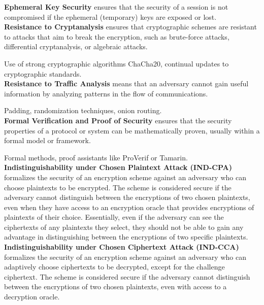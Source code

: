 \documentclass[pdflatex,sn-mathphys-num]{sn-jnl}%
\theoremstyle{thmstyleone}%
\theoremstyle{thmstyletwo}%
\theoremstyle{thmstylethree}%
\begin{document}
\noindent \textbf{Ephemeral Key Security} ensures that the security of a session is not compromised if the ephemeral (temporary) keys are exposed or lost.\\



\noindent \textbf{Resistance to Cryptanalysis} ensures that cryptographic schemes are resistant to attacks that aim to break the encryption, such as brute-force attacks, differential cryptanalysis, or algebraic attacks.

 Use of strong cryptographic algorithms  ChaCha20, continual updates to cryptographic standards.\\

 \noindent \textbf{Resistance to Traffic Analysis} means that an adversary cannot gain useful information by analyzing patterns in the flow of communications.

 Padding, randomization techniques, onion routing.\\


\noindent \textbf{Formal Verification and Proof of Security} ensures that the security properties of a protocol or system can be mathematically proven, usually within a formal model or framework.

 Formal methods, proof assistants like ProVerif or Tamarin.\\

\noindent \textbf{Indistinguishability under Chosen Plaintext Attack (IND-CPA)} formalizes the security of an encryption scheme against an adversary who can choose plaintexts to be encrypted. The scheme is considered secure if the adversary cannot distinguish between the encryptions of two chosen plaintexts, even when they have access to an encryption oracle that provides encryptions of plaintexts of their choice. Essentially, even if the adversary can see the ciphertexts of any plaintexts they select, they should not be able to gain any advantage in distinguishing between the encryptions of two specific plaintexts.\\
    
\noindent \textbf{Indistinguishability under Chosen Ciphertext Attack (IND-CCA)} formalizes the security of an encryption scheme against an adversary who can adaptively choose ciphertexts to be decrypted, except for the challenge ciphertext. The scheme is considered secure if the adversary cannot distinguish between the encryptions of two chosen plaintexts, even with access to a decryption oracle.\\
\end{document}
